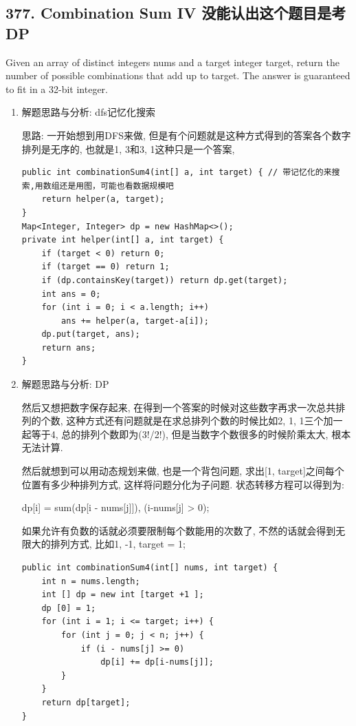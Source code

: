 \documentclass[9pt, b5paaper]{book}
\begin{document}
\subsection{377. Combination Sum IV 没能认出这个题目是考DP}
\label{sec-1-4-28}
Given an array of distinct integers nums and a target integer target, return the number of possible combinations that add up to target.
The answer is guaranteed to fit in a 32-bit integer.
\begin{enumerate}
\item 解题思路与分析: dfs记忆化搜索
\label{sec-1-4-28-1}

思路: 一开始想到用DFS来做, 但是有个问题就是这种方式得到的答案各个数字排列是无序的, 也就是1, 3和3, 1这种只是一个答案, 

\begin{verbatim}
public int combinationSum4(int[] a, int target) { // 带记忆化的来搜索,用数组还是用图，可能也看数据规模吧
    return helper(a, target);
}
Map<Integer, Integer> dp = new HashMap<>();
private int helper(int[] a, int target) {
    if (target < 0) return 0;
    if (target == 0) return 1;
    if (dp.containsKey(target)) return dp.get(target);
    int ans = 0;
    for (int i = 0; i < a.length; i++) 
        ans += helper(a, target-a[i]);
    dp.put(target, ans);
    return ans;
}
\end{verbatim}
\item 解题思路与分析: DP
\label{sec-1-4-28-2}

然后又想把数字保存起来, 在得到一个答案的时候对这些数字再求一次总共排列的个数, 这种方式还有问题就是在求总排列个数的时候比如2, 1, 1三个加一起等于4, 总的排列个数即为(3!/2!), 但是当数字个数很多的时候阶乘太大, 根本无法计算.

然后就想到可以用动态规划来做, 也是一个背包问题, 求出[1, target]之间每个位置有多少种排列方式, 这样将问题分化为子问题. 状态转移方程可以得到为: 

dp[i] = sum(dp[i - nums[j]]),  (i-nums[j] > 0);

如果允许有负数的话就必须要限制每个数能用的次数了, 不然的话就会得到无限大的排列方式, 比如1, -1, target = 1;

\begin{verbatim}
public int combinationSum4(int[] nums, int target) {
    int n = nums.length;
    int [] dp = new int [target +1 ];
    dp [0] = 1;
    for (int i = 1; i <= target; i++) {
        for (int j = 0; j < n; j++) {
            if (i - nums[j] >= 0)
                dp[i] += dp[i-nums[j]];
        }
    }
    return dp[target];
}
\end{verbatim}


\end{enumerate}
\end{document}
